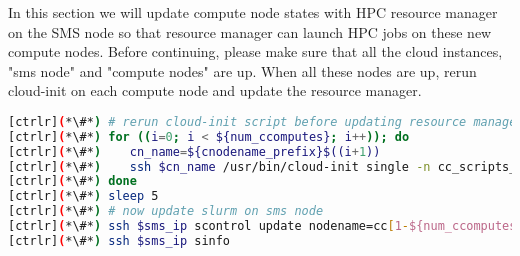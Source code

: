         In this section we will update compute node states with HPC resource manager on the SMS node so that resource manager can launch HPC jobs on these new compute nodes.
        Before continuing, please make sure that all the cloud instances, "sms node" and "compute nodes" are up. When all these nodes are up, rerun cloud-init on each compute node and update the resource manager.



\begin{lstlisting}[language=bash,keywords={}]
[ctrlr](*\#*) # rerun cloud-init script before updating resource manager
[ctrlr](*\#*) for ((i=0; i < ${num_ccomputes}; i++)); do
[ctrlr](*\#*)    cn_name=${cnodename_prefix}$((i+1))
[ctrlr](*\#*)    ssh $cn_name /usr/bin/cloud-init single -n cc_scripts_user
[ctrlr](*\#*) done
[ctrlr](*\#*) sleep 5
[ctrlr](*\#*) # now update slurm on sms node
[ctrlr](*\#*) ssh $sms_ip scontrol update nodename=cc[1-${num_ccomputes}] state=idle
[ctrlr](*\#*) ssh $sms_ip sinfo
\end{lstlisting}
